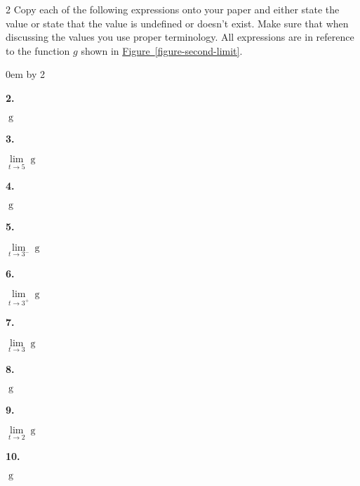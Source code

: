 \documentclass[12pt,]{book}
\theoremstyle{plain}
\theoremstyle{definition}
\numberwithin{equation}{section}
\newenvironment{exercisegroup}%
{\medskip\noindent}%
{\par\bigskip}%
\newlength{\exercisegroupindent}%
\newlength{\exercisegroupitemwidth}%
\newenvironment{exercisegrouplist}%
{\vspace{-\partopsep}%
\begin{adjustwidth}{\exercisegroupindent}{0em}}%
{\end{adjustwidth}%
\vspace{-\partopsep}%
\vspace{\baselineskip}}%
\newenvironment{exercisegroupbyrow}[1]%
{\begin{exercisegrouplist}%
\setlength{\parindent}{0em}%
\setlength{\exercisegroupitemwidth}{\linewidth}%
\addtolength{\exercisegroupitemwidth}{\columnsep}%
\divide\exercisegroupitemwidth by #1%
\addtolength{\exercisegroupitemwidth}{-\columnsep}}%
{\end{exercisegrouplist}}%
\newenvironment{exercisegroupitem}[1]%
{\begin{minipage}[t]{\exercisegroupitemwidth}
\vspace{0pt}%
{\bfseries#1}%
\rule{0pt}{\baselineskip}}{\strut%
\end{minipage}%
\hspace{\columnsep}}%
\providecommand\phantomsection{}
\newcommand{\fe}[2]{\mathop{{#1}{\left(#2\right)}}}
\begin{document}
\begin{multicols}{2}
\begin{exercisegroup}%
Copy each of the following expressions onto your paper and either state the value or state that the value is undefined or doesn't exist. Make sure that when discussing the values you use proper terminology. All expressions are in reference to the function \(g\) shown in \hyperref[figure-second-limit]{Figure~\ref*{figure-second-limit}}.%
\par
\begin{exercisegroupbyrow}{2}%
\begin{exercisegroupitem}{2. }\phantomsection\hypertarget{exercise-47}{\null}
\(\fe{g}{5}\)%
\end{exercisegroupitem}%
\begin{exercisegroupitem}{3. }\phantomsection\hypertarget{exercise-48}{\null}
\(\lim\limits_{t\to5}\fe{g}{t}\)%
\end{exercisegroupitem}%
\par%
\begin{exercisegroupitem}{4. }\phantomsection\hypertarget{exercise-49}{\null}
\(\fe{g}{3}\)%
\end{exercisegroupitem}%
\begin{exercisegroupitem}{5. }\phantomsection\hypertarget{exercise-50}{\null}
\(\lim\limits_{t\to3^{-}}\fe{g}{t}\)%
\end{exercisegroupitem}%
\par%
\begin{exercisegroupitem}{6. }\phantomsection\hypertarget{exercise-51}{\null}
\(\lim\limits_{t\to3^{+}}\fe{g}{t}\)%
\end{exercisegroupitem}%
\begin{exercisegroupitem}{7. }\phantomsection\hypertarget{exercise-52}{\null}
\(\lim\limits_{t\to3}\fe{g}{t}\)%
\end{exercisegroupitem}%
\par%
\begin{exercisegroupitem}{8. }\phantomsection\hypertarget{exercise-53}{\null}
\(\fe{g}{2}\)%
\end{exercisegroupitem}%
\begin{exercisegroupitem}{9. }\phantomsection\hypertarget{exercise-54}{\null}
\(\lim\limits_{t\to2}\fe{g}{t}\)%
\end{exercisegroupitem}%
\par%
\begin{exercisegroupitem}{10. }\phantomsection\hypertarget{exercise-55}{\null}
\(\fe{g}{-2}\)%
\end{exercisegroupitem}%

\end{exercisegroupbyrow}
\end{exercisegroup}
\end{multicols}
\end{document}
